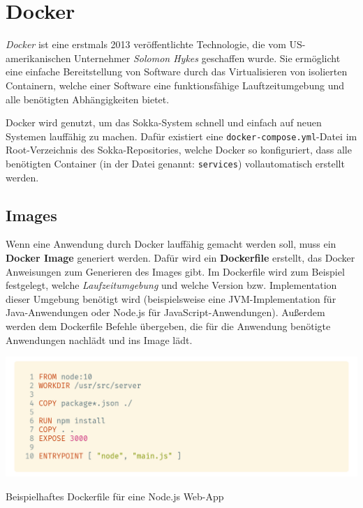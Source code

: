 \section{Docker}

\textit{Docker} ist eine erstmals 2013 veröffentlichte Technologie, die vom US-amerikanischen Unternehmer \textit{Solomon Hykes} geschaffen wurde. \cite{hykes2018} Sie ermöglicht eine einfache Bereitstellung von Software durch das Virtualisieren von isolierten Containern, welche einer Software eine funktionsfähige Lauftzeitumgebung und alle benötigten Abhängigkeiten bietet.

Docker wird genutzt, um das Sokka-System schnell und einfach auf neuen Systemen lauffähig zu machen. Dafür existiert eine \lstinline{docker-compose.yml}-Datei im Root-Verzeichnis des Sokka-Repositories, welche Docker so konfiguriert, dass alle benötigten Container (in der Datei genannt: \lstinline{services}) vollautomatisch erstellt werden.

\subsection{Images}

Wenn eine Anwendung durch Docker lauffähig gemacht werden soll, muss ein \textbf{Docker Image} generiert werden. Dafür wird ein \textbf{Dockerfile} erstellt, das Docker Anweisungen zum Generieren des Images gibt. Im Dockerfile wird zum Beispiel festgelegt, welche \textit{Laufzeitumgebung} und welche Version bzw. Implementation dieser Umgebung benötigt wird (beispielsweise eine JVM-Implementation für Java-Anwendungen oder Node.js für JavaScript-Anwendungen). Außerdem werden dem Dockerfile Befehle übergeben, die für die Anwendung benötigte Anwendungen nachlädt und ins Image lädt.

\begin{code}[htp]
    \begin{center}
        \includegraphics[width=1\textwidth]{images/Docker/dockerfile.png}
        \vspace{-25pt}
        \caption{Beispielhaftes Dockerfile für eine Node.js Web-App}
    \end{center}
\end{code}

